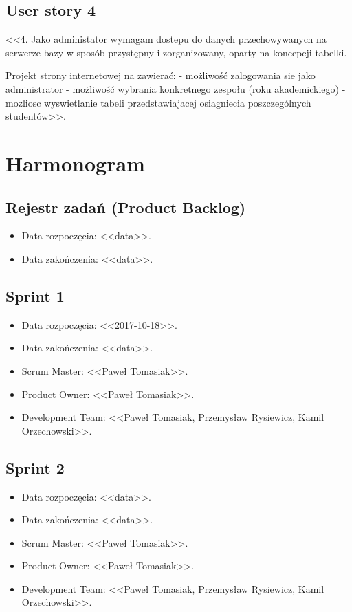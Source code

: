 \documentclass[a4paper]{article}
\begin{document}
\subsection*{User story 4}
<<4.
Jako administator wymagam dostepu do danych przechowywanych na serwerze bazy w sposób przystępny i zorganizowany, oparty na koncepcji tabelki.

Projekt strony internetowej na zawierać:
- możliwość zalogowania sie jako administrator
- możliwość wybrania konkretnego zespołu (roku akademickiego)
- mozliosc wyswietlanie tabeli przedstawiajacej osiagniecia poszczególnych studentów>>.

\section{Harmonogram}

\subsection{Rejestr zadań (Product Backlog)}

\begin{itemize}
\item Data rozpoczęcia: <<data>>.
\item  Data zakończenia: <<data>>.
\end{itemize}

\subsection{Sprint 1}

\begin{itemize}
\item Data rozpoczęcia: <<2017-10-18>>.
\item Data zakończenia: <<data>>.
\item Scrum Master: <<Paweł Tomasiak>>.
\item Product Owner: <<Paweł Tomasiak>>.
\item Development Team: <<Paweł Tomasiak, Przemysław Rysiewicz, Kamil Orzechowski>>.
\end{itemize}

\subsection{Sprint 2}

\begin{itemize}
\item Data rozpoczęcia: <<data>>.
\item  Data zakończenia: <<data>>.
\item Scrum Master: <<Paweł Tomasiak>>.
\item Product Owner: <<Paweł Tomasiak>>.
\item Development Team: <<Paweł Tomasiak, Przemysław Rysiewicz, Kamil Orzechowski>>.
\end{itemize}
\end{document}
